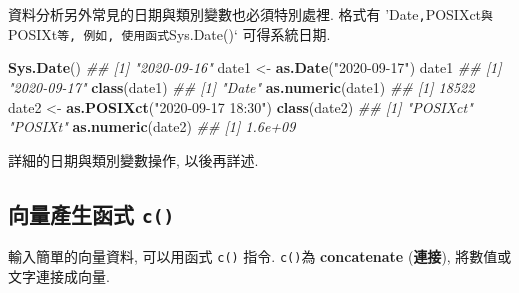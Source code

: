 \documentclass[
]{book}
\newenvironment{Shaded}{\begin{snugshade}}{\end{snugshade}}
\newcommand{\CommentTok}[1]{\textcolor[rgb]{0.56,0.35,0.01}{\textit{#1}}}
\newcommand{\KeywordTok}[1]{\textcolor[rgb]{0.13,0.29,0.53}{\textbf{#1}}}
\newcommand{\NormalTok}[1]{#1}
\newcommand{\StringTok}[1]{\textcolor[rgb]{0.31,0.60,0.02}{#1}}
\begin{document}
資料分析另外常見的日期與類別變數也必須特別處裡.
格式有 'Date\texttt{,}POSIXct\texttt{與}POSIXt\texttt{等,\ 例如,\ 使用函式}Sys.Date()` 可得系統日期.

\begin{Shaded}
\begin{Highlighting}[]
\KeywordTok{Sys.Date}\NormalTok{()}
\CommentTok{\#\# [1] "2020{-}09{-}16"}
\NormalTok{date1 \textless{}{-}}\StringTok{ }\KeywordTok{as.Date}\NormalTok{(}\StringTok{"2020{-}09{-}17"}\NormalTok{)}
\NormalTok{date1}
\CommentTok{\#\# [1] "2020{-}09{-}17"}
\KeywordTok{class}\NormalTok{(date1)}
\CommentTok{\#\# [1] "Date"}
\KeywordTok{as.numeric}\NormalTok{(date1)}
\CommentTok{\#\# [1] 18522}
\NormalTok{date2 \textless{}{-}}\StringTok{ }\KeywordTok{as.POSIXct}\NormalTok{(}\StringTok{"2020{-}09{-}17 18:30"}\NormalTok{)}
\KeywordTok{class}\NormalTok{(date2)}
\CommentTok{\#\# [1] "POSIXct" "POSIXt"}
\KeywordTok{as.numeric}\NormalTok{(date2)}
\CommentTok{\#\# [1] 1.6e+09}
\end{Highlighting}
\end{Shaded}

詳細的日期與類別變數操作, 以後再詳述.

\hypertarget{ux5411ux91cfux7522ux751fux51fdux5f0f-c}{%
\subsection{\texorpdfstring{向量產生函式 \texttt{c()}}{向量產生函式 c()}}\label{ux5411ux91cfux7522ux751fux51fdux5f0f-c}}

輸入簡單的向量資料, 可以用函式
\texttt{c()}
指令.
\texttt{c()}為 \textbf{concatenate} (\textbf{連接}),
將數值或文字連接成向量.
\end{document}
